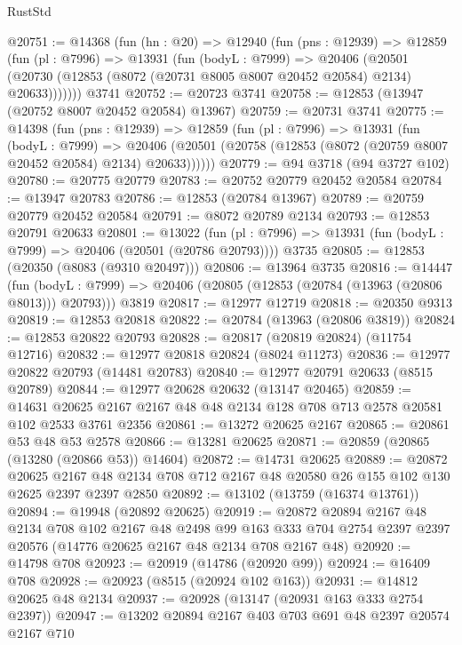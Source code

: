 \begin{lexlean}{RustStd}
\begin{coremodule}
@20751 := @14368
    (fun (hn : @20) =>
    @12940
      (fun (pns : @12939) =>
      @12859
        (fun (pl : @7996) =>
        @13931
          (fun (bodyL : @7999) =>
          @20406
            (@20501 (@20730 (@12853 (@8072 (@20731 @8005 @8007 @20452 @20584) @2134) @20633)))))))
    @3741
@20752 := @20723 @3741
@20758 := @12853 (@13947 (@20752 @8007 @20452 @20584) @13967)
@20759 := @20731 @3741
@20775 := @14398
    (fun (pns : @12939) =>
    @12859
      (fun (pl : @7996) =>
      @13931
        (fun (bodyL : @7999) =>
        @20406 (@20501 (@20758 (@12853 (@8072 (@20759 @8007 @20452 @20584) @2134) @20633))))))
@20779 := @94 @3718 (@94 @3727 @102)
@20780 := @20775 @20779
@20783 := @20752 @20779 @20452 @20584
@20784 := @13947 @20783
@20786 := @12853 (@20784 @13967)
@20789 := @20759 @20779 @20452 @20584
@20791 := @8072 @20789 @2134
@20793 := @12853 @20791 @20633
@20801 := @13022
    (fun (pl : @7996) => @13931 (fun (bodyL : @7999) => @20406 (@20501 (@20786 @20793))))
    @3735
@20805 := @12853 (@20350 (@8083 (@9310 @20497)))
@20806 := @13964 @3735
@20816 := @14447
    (fun (bodyL : @7999) => @20406 (@20805 (@12853 (@20784 (@13963 (@20806 @8013))) @20793)))
    @3819
@20817 := @12977 @12719
@20818 := @20350 @9313
@20819 := @12853 @20818
@20822 := @20784 (@13963 (@20806 @3819))
@20824 := @12853 @20822 @20793
@20828 := @20817 (@20819 @20824) (@11754 @12716)
@20832 := @12977 @20818 @20824 (@8024 @11273)
@20836 := @12977 @20822 @20793 (@14481 @20783)
@20840 := @12977 @20791 @20633 (@8515 @20789)
@20844 := @12977 @20628 @20632 (@13147 @20465)
@20859 := @14631 @20625 @2167 @2167 @48 @48 @2134 @128 @708 @713 @2578 @20581 @102 @2533 @3761 @2356
@20861 := @13272 @20625 @2167
@20865 := @20861 @53 @48 @53 @2578
@20866 := @13281 @20625
@20871 := @20859 (@20865 (@13280 (@20866 @53)) @14604)
@20872 := @14731 @20625
@20889 := @20872
    @20625
    @2167
    @48
    @2134
    @708
    @712
    @2167
    @48
    @20580
    @26
    @155
    @102
    @130
    @2625
    @2397
    @2397
    @2850
@20892 := @13102 (@13759 (@16374 @13761))
@20894 := @19948 (@20892 @20625)
@20919 := @20872
    @20894
    @2167
    @48
    @2134
    @708
    @102
    @2167
    @48
    @2498
    @99
    @163
    @333
    @704
    @2754
    @2397
    @2397
    @20576
    (@14776 @20625 @2167 @48 @2134 @708 @2167 @48)
@20920 := @14798 @708
@20923 := @20919 (@14786 (@20920 @99))
@20924 := @16409 @708
@20928 := @20923 (@8515 (@20924 @102 @163))
@20931 := @14812 @20625 @48 @2134
@20937 := @20928 (@13147 (@20931 @163 @333 @2754 @2397))
@20947 := @13202 @20894 @2167 @403 @703 @691 @48 @2397 @20574 @2167 @710

\end{coremodule}
\end{lexlean}
